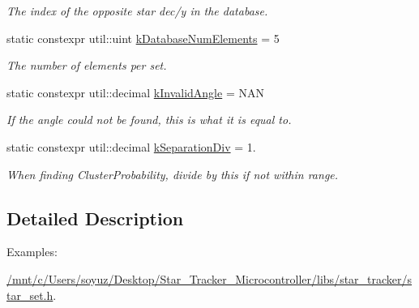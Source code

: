 \begin{DoxyCompactItemize}
\begin{DoxyCompactList}\small\item\em The index of the opposite star dec/y in the database. \end{DoxyCompactList}\item 
\mbox{\label{classstar__tracker_1_1StarSet_ae1846e984437ea84bec934f952f7340b}} 
static constexpr util\+::uint \hyperlink{classstar__tracker_1_1StarSet_ae1846e984437ea84bec934f952f7340b}{k\+Database\+Num\+Elements} = 5
\begin{DoxyCompactList}\small\item\em The number of elements per set. \end{DoxyCompactList}\item 
\mbox{\label{classstar__tracker_1_1StarSet_a8c45bbdc8fefc06a9e71b980cb8f5e93}} 
static constexpr util\+::decimal \hyperlink{classstar__tracker_1_1StarSet_a8c45bbdc8fefc06a9e71b980cb8f5e93}{k\+Invalid\+Angle} = N\+AN
\begin{DoxyCompactList}\small\item\em If the angle could not be found, this is what it is equal to. \end{DoxyCompactList}\item 
\mbox{\label{classstar__tracker_1_1StarSet_aaf8b9e127b7a05710cc141ec9e58cea1}} 
static constexpr util\+::decimal \hyperlink{classstar__tracker_1_1StarSet_aaf8b9e127b7a05710cc141ec9e58cea1}{k\+Separation\+Div} = 1.
\begin{DoxyCompactList}\small\item\em When finding Cluster\+Probability, divide by this if not within range. \end{DoxyCompactList}\end{DoxyCompactItemize}


\subsection{Detailed Description}
\begin{Desc}
\item[Examples\+: ]\par
\hyperlink{_2mnt_2c_2Users_2soyuz_2Desktop_2Star_Tracker_Microcontroller_2libs_2star_tracker_2star_set_8h-example}{/mnt/c/\+Users/soyuz/\+Desktop/\+Star\+\_\+\+Tracker\+\_\+\+Microcontroller/libs/star\+\_\+tracker/star\+\_\+set.\+h}.\end{Desc}


